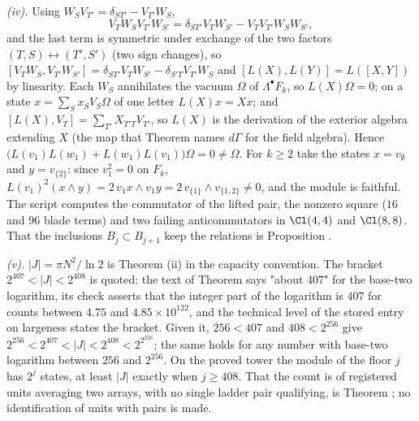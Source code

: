 \emph{(iv).} Using $W_{S}V_{T'} = \delta_{ST'} - V_{T'}W_{S}$,
\[
V_{T}W_{S}V_{T'}W_{S'} = \delta_{ST'}V_{T}W_{S'} - V_{T}V_{T'}W_{S}W_{S'} ,
\]
and the last term is symmetric under exchange of the two factors $(T, S) \leftrightarrow (T', S')$ (two sign changes), so $[V_{T}W_{S}, V_{T'}W_{S'}] = \delta_{ST'}V_{T}W_{S'} - \delta_{S'T}V_{T'}W_{S}$ and $[L(X), L(Y)] = L([X, Y])$ by linearity. Each $W_{S}$ annihilates the vacuum $\Omega$ of $\Lambda^{\bullet}F_{k}$, so $L(X)\Omega = 0$; on a state $x = \sum_{S}x_{S}V_{S}\Omega$ of one letter $L(X)x = Xx$; and $[L(X), V_{T}] = \sum_{T'}X_{T'T}V_{T'}$, so $L(X)$ is the derivation of the exterior algebra extending $X$ (the map that Theorem  names $d\Gamma$ for the field algebra). Hence $\bigl(L(v_{1})L(w_{1}) + L(w_{1})L(v_{1})\bigr)\Omega = 0 \neq \Omega$. For $k \ge 2$ take the states $x = v_{\emptyset}$ and $y = v_{\{2\}}$: since $v_{1}^{2} = 0$ on $F_{k}$, $L(v_{1})^{2}(x \wedge y) = 2\,v_{1}x \wedge v_{1}y = 2\,v_{\{1\}} \wedge v_{\{1,2\}} \neq 0$, and the module is faithful. The script computes the commutator of the lifted pair, the nonzero square ($16$ and $96$ blade terms) and two failing anticommutators in $\Cl(4,4)$ and $\Cl(8,8)$. That the inclusions $B_{j} \subset B_{j+1}$ keep the relations is Proposition .

\emph{(v).} $|J| = \pi N^{2}/\ln 2$ is Theorem (ii) in the capacity convention. The bracket $2^{407} < |J| < 2^{408}$ is quoted: the text of Theorem  says "about $407$" for the base-two logarithm, its check asserts that the integer part of the logarithm is $407$ for counts between $4.75$ and $4.85 \times 10^{122}$, and the technical level of the stored entry on largeness states the bracket. Given it, $256 < 407$ and $408 < 2^{256}$ give $2^{256} < 2^{407} < |J| < 2^{408} < 2^{2^{256}}$; the same holds for any number with base-two logarithm between $256$ and $2^{256}$. On the proved tower the module of the floor $j$ has $2^{j}$ states, at least $|J|$ exactly when $j \ge 408$. That the count is of registered units averaging two arrays, with no single ladder pair qualifying, is Theorem ; no identification of units with pairs is made.

